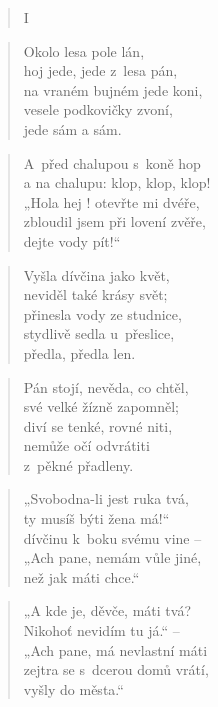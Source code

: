 
\begin{verse}
I~\end{verse}

\begin{verse}
Okolo lesa pole lán, \\
hoj jede, jede z~lesa pán, \\
na vraném bujném jede koni, \\
vesele podkovičky zvoní, \\
jede sám a sám.
\end{verse}

\begin{verse}
A~před chalupou s~koně hop \\
a na chalupu: klop, klop, klop! \\
„Hola hej ! otevřte mi dvéře, \\
zbloudil jsem při lovení zvěře, \\
dejte vody pít!“
\end{verse}

\begin{verse}
Vyšla dívčina jako květ, \\
neviděl také krásy svět; \\
přinesla vody ze studnice, \\
stydlivě sedla u~přeslice, \\
předla, předla len.
\end{verse}

\begin{verse}
Pán stojí, nevěda, co chtěl, \\
své velké žízně zapomněl; \\
diví se tenké, rovné niti, \\
nemůže očí odvrátiti \\
z~pěkné přadleny.
\end{verse}

\begin{verse}
„Svobodna-li jest ruka tvá, \\
ty musíš býti žena má!“ \\
dívčinu k~boku svému vine -- \\
„Ach pane, nemám vůle jiné, \\
než jak máti chce.“
\end{verse}

\begin{verse}
„A kde je, děvče, máti tvá? \\
Nikohoť nevidím tu já.“ -- \\
„Ach pane, má nevlastní máti \\
zejtra se s~dcerou domů vrátí, \\
vyšly do města.“
\end{verse}

